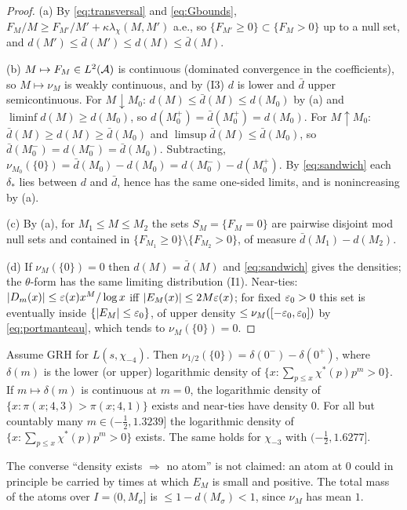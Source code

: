 \begin{proof}
(a) By \eqref{eq:transversal} and \eqref{eq:Gbounds}, $F_M/M\ge F_{M'}/M'+\kappa\lambda_\chi(M,M')$ a.e., so $\{F_{M'}\ge0\}\subset\{F_M>0\}$ up to a null set, and $d(M')\le\bar d(M')\le d(M)\le\bar d(M)$.

(b) $M\mapsto F_M\in L^2(\mathcal A)$ is continuous (dominated convergence in the coefficients), so $M\mapsto\nu_M$ is weakly continuous, and by (I3) $d$ is lower and $\bar d$ upper semicontinuous. For $M\downarrow M_0$: $d(M)\le\bar d(M)\le d(M_0)$ by (a) and $\liminf d(M)\ge d(M_0)$, so $d(M_0^+)=\bar d(M_0^+)=d(M_0)$. For $M\uparrow M_0$: $\bar d(M)\ge d(M)\ge\bar d(M_0)$ and $\limsup\bar d(M)\le\bar d(M_0)$, so $\bar d(M_0^-)=d(M_0^-)=\bar d(M_0)$. Subtracting, $\nu_{M_0}(\{0\})=\bar d(M_0)-d(M_0)=d(M_0^-)-d(M_0^+)$. By \eqref{eq:sandwich} each $\delta_*$ lies between $d$ and $\bar d$, hence has the same one-sided limits, and is nonincreasing by (a).

(c) By (a), for $M_1\le M\le M_2$ the sets $S_M=\{F_M=0\}$ are pairwise disjoint mod null sets and contained in $\{F_{M_1}\ge0\}\setminus\{F_{M_2}>0\}$, of measure $\bar d(M_1)-d(M_2)$.

(d) If $\nu_M(\{0\})=0$ then $d(M)=\bar d(M)$ and \eqref{eq:sandwich} gives the densities; the $\theta$-form has the same limiting distribution (I1). Near-ties: $|D_m(x)|\le\varepsilon(x)x^M/\log x$ iff $|E_M(x)|\le2M\varepsilon(x)$; for fixed $\varepsilon_0>0$ this set is eventually inside $\{|E_M|\le\varepsilon_0\}$, of upper density $\le\nu_M([-\varepsilon_0,\varepsilon_0])$ by \eqref{eq:portmanteau}, which tends to $\nu_M(\{0\})=0$.
\end{proof}

\begin{corollary}\label{cor:classical}
Assume GRH for $L(s,\chi_{-4})$. Then $\nu_{1/2}(\{0\})=\delta(0^-)-\delta(0^+)$, where $\delta(m)$ is the lower (or upper) logarithmic density of $\{x:\sum_{p\le x}\chi^*(p)p^m>0\}$. If $m\mapsto\delta(m)$ is continuous at $m=0$, the logarithmic density of $\{x:\pi(x;4,3)>\pi(x;4,1)\}$ exists and near-ties have density $0$. For all but countably many $m\in(-\frac12,1.3239]$ the logarithmic density of $\{x:\sum_{p\le x}\chi^*(p)p^m>0\}$ exists. The same holds for $\chi_{-3}$ with $(-\frac12,1.6277]$.
\end{corollary}

The converse ``density exists $\Rightarrow$ no atom'' is not claimed: an atom at $0$ could in principle be carried by times at which $E_M$ is small and positive. The total mass of the atoms over $I=(0,M_\sigma]$ is $\le1-d(M_\sigma)<1$, since $\nu_M$ has mean $1$.

